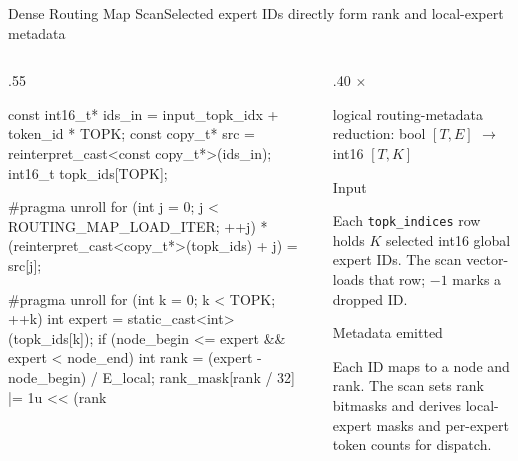 \documentclass[aspectratio=169,10pt]{beamer}
\renewcommand{\NvidiaSource}[1]{}
\newcommand{\LocalSource}[1]{\NvidiaSource{\texttt{#1}}}
\begin{document}
\begin{frame}[fragile]{Dense Routing Map Scan}{Selected expert IDs directly form rank and local-expert metadata}
  \LocalSource{DeepEP/csrc/hybrid_ep/backend/hybrid_ep_backend.cuh}
  \begin{columns}[T,onlytextwidth]
    \begin{column}{.55\textwidth}
      \begin{NvidiaCode}[language=NvidiaCUDA,basicstyle=\ttfamily\fontsize{6.1}{7.2}\selectfont]
const int16_t* ids_in = input_topk_idx + token_id * TOPK;
const copy_t* src = reinterpret_cast<const copy_t*>(ids_in);
int16_t topk_ids[TOPK];

#pragma unroll
for (int j = 0; j < ROUTING_MAP_LOAD_ITER; ++j)
  *(reinterpret_cast<copy_t*>(topk_ids) + j) = src[j];

#pragma unroll
for (int k = 0; k < TOPK; ++k) {
  int expert = static_cast<int>(topk_ids[k]);
  if (node_begin <= expert && expert < node_end) {
    int rank = (expert - node_begin) / E_local;
    rank_mask[rank / 32] |= 1u << (rank %
  }
}
      \end{NvidiaCode}
    \end{column}
    \begin{column}{.40\textwidth}
      {\NvidiaSansMedium\fontsize{13}{15.5}$\times$}\par
      {\fontsize{7.3}{8.6}\selectfont\color{NvidiaGreen}logical routing-metadata reduction:
      bool $[T,E]$ $\rightarrow$ int16 $[T,K]$}\par
      \vspace{.06in}
      {\NvidiaSansMedium Input}\NvidiaTightRule{.6pt}\vspace{.04in}
      {\fontsize{7.8}{9.2}\selectfont\setlength{\parskip}{0pt}\noindent
      Each \texttt{topk\_indices} row holds $K$ selected int16 global expert IDs. The scan
      vector-loads that row; $-1$ marks a dropped ID.\par}
      \vspace{.06in}
      {\NvidiaSansMedium Metadata emitted}\NvidiaTightRule{.6pt}\vspace{.04in}
      {\fontsize{7.8}{9.2}\selectfont\setlength{\parskip}{0pt}\noindent
      Each ID maps to a node and rank. The scan sets rank bitmasks and derives local-expert masks
      and per-expert token counts for dispatch.\par}
    \end{column}
  \end{columns}
\end{frame}
\end{document}
